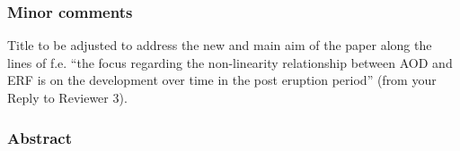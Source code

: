 \documentclass{reviewresponse}
\begin{document}
  \subsubsection*{Minor comments}

  \begin{revcomment}[colframe={colorcommentresolved}]
    Title to be adjusted to address the new and main aim of the paper along the lines of
    f.e. ``the focus regarding the non-linearity relationship between AOD and ERF is on
    the development over time in the post eruption period'' (from your Reply to Reviewer
    3).
  \end{revcomment}

  \subsubsection*{Abstract}
\end{document}
